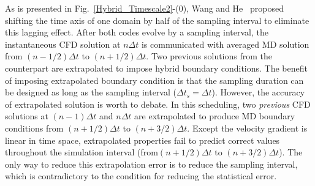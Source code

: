 \documentclass[preprint,12pt]{elsarticle}
\begin{document}
As is presented in Fig.~\ref{Hybrid_Timescale2}-(0), Wang and He~\cite{Wang} proposed shifting the time axis of one domain by half of the sampling interval to eliminate this lagging effect. After both codes evolve by a sampling interval, the instantaneous CFD solution at $n{\Delta}t$ is communicated with averaged MD solution from $(n-1/2){\Delta}t$ to $(n+1/2){\Delta}t$. Two previous solutions from the counterpart are extrapolated to impose hybrid boundary conditions. The benefit of imposing extrapolated boundary condition is that the sampling duration can be designed as long as the sampling interval (${\Delta}t_{s}={\Delta}t$). However, the accuracy of extrapolated solution is worth to debate. In this scheduling, two \textit{previous} CFD solutions at $(n-1){\Delta}t$ and $n{\Delta}t$ are extrapolated to produce MD boundary conditions from $(n+1/2){\Delta}t$ to $(n+3/2){\Delta}t$. Except the velocity gradient is linear in time space, extrapolated properties fail to predict correct values throughout the simulation interval (from$(n+1/2){\Delta}t$ to $(n+3/2){\Delta}t$). The only way to reduce this extrapolation error is to reduce the sampling interval, which is contradictory to the condition for reducing the statistical error.
\end{document}

